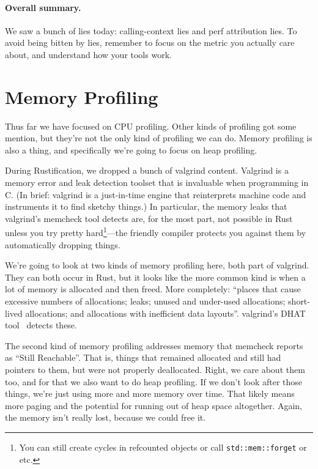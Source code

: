 \documentclass[a4paper]{report}
\newcommand{\CPP}{C\nolinebreak\hspace{-.05em}\raisebox{.4ex}{\tiny\bf +}\nolinebreak\hspace{-.10em}\raisebox{.4ex}{\tiny\bf +}}
\def\CPP{{C\nolinebreak[4]\hspace{-.05em}\raisebox{.4ex}{\tiny\bf ++}}}
\begin{document}


\paragraph{Overall summary.} We saw a bunch of lies today: calling-context lies and perf attribution
lies. To avoid being bitten by lies, remember to focus on the metric you actually care about,
and understand how your tools work.

\section*{Memory Profiling}

Thus far we have focused on CPU profiling. Other kinds of profiling got some mention, but they're not the only kind of profiling we can do. Memory profiling is also a thing, and specifically we're going to focus on heap profiling.

During Rustification, we dropped a bunch of valgrind content. Valgrind is a memory error and leak detection toolset that is invaluable when programming in \CPP. (In brief: valgrind is a just-in-time engine that reinterprets machine code and instruments it to find sketchy things.) In particular, the memory leaks that valgrind's memcheck tool detects are, for the most part, not possible in Rust unless you try pretty hard\footnote{You can still create cycles in refcounted objects or call \texttt{std::mem::forget} or etc.}---the friendly compiler protects you against them by automatically dropping things.

We're going to look at two kinds of memory profiling here, both part of valgrind. They can both occur in Rust, but it looks like the more common kind is when a lot of memory is allocated and then freed. More completely: ``places that cause excessive numbers of allocations; leaks; unused and under-used allocations; short-lived allocations; and allocations with inefficient data layouts''. valgrind's DHAT tool~\cite[Chapter~10]{valgrind} detects these.

The second kind of memory profiling addresses memory that memcheck reports as ``Still Reachable''. That is, things that remained allocated and still had pointers to them, but were not properly deallocated. Right, we care about them too, and for that we also want to do heap profiling. If we don't look after those things, we're just using more and more memory over time. That likely means more paging and the potential for running out of heap space altogether. Again, the memory isn't really lost, because we could free it.
\end{document}
